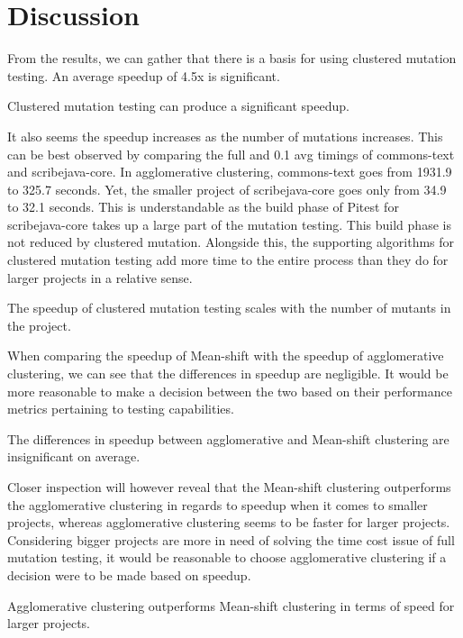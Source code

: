 \documentclass[twoside]{uva-inf-bachelor-thesis}
\begin{document}
\clearpage

\section{Discussion}
From the results, we can gather that there is a basis for using clustered mutation testing. An average speedup of 4.5x is significant.
\begin{finding}
Clustered mutation testing can produce a significant speedup.
\end{finding}

It also seems the speedup increases as the number of mutations increases. This can be best observed by comparing the full and 0.1 avg timings of commons-text and scribejava-core. In agglomerative clustering, commons-text goes from 1931.9 to 325.7 seconds. Yet, the smaller project of scribejava-core goes only from 34.9 to 32.1 seconds. This is understandable as the build phase of Pitest for scribejava-core takes up a large part of the mutation testing. This build phase is not reduced by clustered mutation. Alongside this, the supporting algorithms for clustered mutation testing add more time to the entire process than they do for larger projects in a relative sense.
\begin{hypothesis}
The speedup of clustered mutation testing scales with the number of mutants in the project.
\end{hypothesis}

When comparing the speedup of Mean-shift with the speedup of agglomerative clustering, we can see that the differences in speedup are negligible. It would be more reasonable to make a decision between the two based on their performance metrics pertaining to testing capabilities.
\begin{finding}
The differences in speedup between agglomerative and Mean-shift clustering are insignificant on average.
\end{finding}

Closer inspection will however reveal that the Mean-shift clustering outperforms the agglomerative clustering in regards to speedup when it comes to smaller projects, whereas agglomerative clustering seems to be faster for larger projects. Considering bigger projects are more in need of solving the time cost issue of full mutation testing, it would be reasonable to choose agglomerative clustering if a decision were to be made based on speedup.
\begin{hypothesis}
Agglomerative clustering outperforms Mean-shift clustering in terms of speed for larger projects.
\end{hypothesis}
\end{document}
